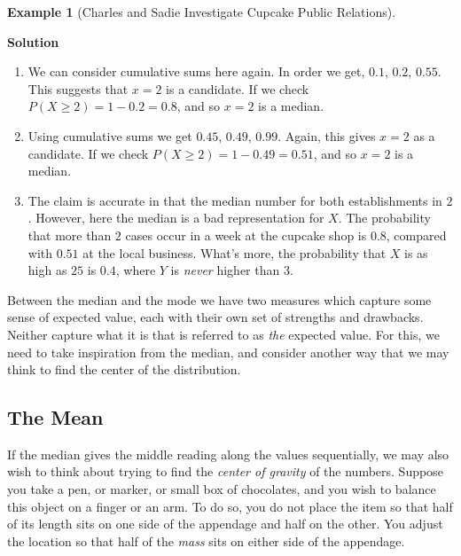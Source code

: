\documentclass[
  letterpaper,
  DIV=11,
  numbers=noendperiod]{scrreprt}
\theoremstyle{definition}
\theoremstyle{definition}
\newtheorem{example}{Example}[chapter]
\theoremstyle{definition}
\theoremstyle{remark}
\begin{document}
\begin{example}[Charles and Sadie Investigate Cupcake Public
Relations]
\begin{tcolorbox}[enhanced jigsaw, colback=white, colframe=quarto-callout-color-frame, arc=.35mm, leftrule=.75mm, rightrule=.15mm, opacityback=0, breakable, bottomrule=.15mm, left=2mm, toprule=.15mm]
\vspace{-3mm}\textbf{Solution}\vspace{3mm}

\begin{enumerate}
\def\labelenumi{\alph{enumi}.}
\item
  We can consider cumulative sums here again. In order we get, \(0.1\),
  \(0.2\), \(0.55\). This suggests that \(x=2\) is a candidate. If we
  check \(P(X \geq 2) = 1 - 0.2 = 0.8\), and so \(x=2\) is a median.
\item
  Using cumulative sums we get \(0.45\), \(0.49\), \(0.99\). Again, this
  gives \(x=2\) as a candidate. If we check
  \(P(X \geq 2) = 1 - 0.49 = 0.51\), and so \(x=2\) is a median.
\item
  The claim is accurate in that the median number for both
  establishments in \(2\). However, here the median is a bad
  representation for \(X\). The probability that more than \(2\) cases
  occur in a week at the cupcake shop is \(0.8\), compared with \(0.51\)
  at the local business. What's more, the probability that \(X\) is as
  high as \(25\) is \(0.4\), where \(Y\) is \emph{never} higher than
  \(3\).
\end{enumerate}

\end{tcolorbox}

\end{example}

Between the median and the mode we have two measures which capture some
sense of expected value, each with their own set of strengths and
drawbacks. Neither capture what it is that is referred to as \emph{the}
expected value. For this, we need to take inspiration from the median,
and consider another way that we may think to find the center of the
distribution.

\subsection{The Mean}\label{the-mean}

If the median gives the middle reading along the values sequentially, we
may also wish to think about trying to find the \emph{center of gravity}
of the numbers. Suppose you take a pen, or marker, or small box of
chocolates, and you wish to balance this object on a finger or an arm.
To do so, you do not place the item so that half of its length sits on
one side of the appendage and half on the other. You adjust the location
so that half of the \emph{mass} sits on either side of the appendage.
\end{document}
